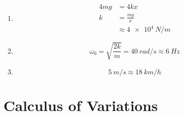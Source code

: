 \documentclass{article}
\begin{document}
\setcounter{subsection}{42}
\subsection{}

\begin{enumerate}
  \item

        \begin{align*}
          4 m g & = 4 k x                \\
          k     & = \frac{m g}{x}        \\
                & \approx \qty{4e4}{N/m}
        \end{align*}

  \item \[\omega_0 = \sqrt{\frac{2 k}{m}} = \qty{40}{rad/s} \approx \qty{6}{Hz}\]

  \item \[\qty{5}{m/s} \approx \qty{18}{km/h}\]
\end{enumerate}

\section{Calculus of Variations}

\setcounter{subsection}{4}
\subsection{}
\end{document}

